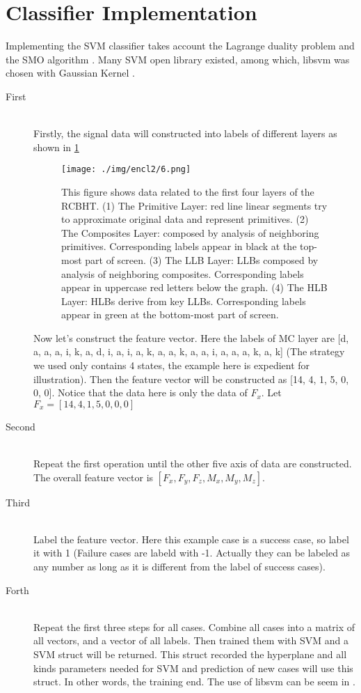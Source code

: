 \section{Classifier Implementation}
\indent Implementing the SVM classifier takes account the Lagrange duality problem \cite{hager1976lagrange} and the SMO algorithm \cite{keerthi2001improvements}. Many SVM open library existed, among which, libsvm \cite{CC01a} was chosen with Gaussian Kernel \cite{keerthi2003asymptotic}. \\
\begin{description}
    \item[First] \hfill \\
        Firstly, the signal data will constructed into labels of different layers as shown in \ref{fig:hlbehav} \cite{2013IJMA-Rojas-TwrdsSnapSensing} \\
\begin{figure}[h]
    \centering
    \texttt{[image: ./img/encl2/6.png]}
    \caption{This figure shows data related to the first four layers of the RCBHT. (1) The Primitive Layer: red line linear segments try to approximate original data and represent primitives. (2) The Composites Layer: composed by analysis of neighboring primitives. Corresponding labels appear in black at the top-most part of screen. (3) The LLB Layer: LLBs composed by analysis of neighboring composites. Corresponding labels appear in uppercase red letters below the graph. (4) The HLB Layer: HLBs derive from key LLBs. Corresponding labels appear in green at the bottom-most part of screen.}
    \label{fig:hlbehav}
\end{figure}
        Now let's construct the feature vector. Here the labels of MC layer are [d, a, a, a, i, k, a, d, i, a, i, a, k, a, a, k, a, a, i, a, a, a, k, a, k] (The strategy we used only contains 4 states, the example here is expedient for illustration). Then the feature vector will be constructed as [14, 4, 1, 5, 0, 0, 0]. Notice that the data here is only the data of $F_{x}$. Let $F_{x} = [14, 4, 1, 5, 0, 0, 0]$
    \item[Second] \hfill \\
        Repeat the first operation until the other five axis of data are constructed. The overall feature vector is $[F_{x}, F_{y}, F_{z}, M_{x}, M_{y}, M_{z}]$.
    \item[Third] \hfill \\
        Label the feature vector. Here this example case is a success case, so label it with 1 (Failure cases are labeld with -1. Actually they can be labeled as any number as long as it is different from the label of success cases). 
    \item[Forth] \hfill \\
        Repeat the first three steps for all cases. Combine all cases into a matrix of all vectors, and a vector of all labels. Then trained them with SVM and a SVM struct will be returned. This struct recorded the hyperplane and all kinds parameters needed for SVM and prediction of new cases will use this struct. In other words, the training end. The use of libsvm can be seem in \cite{CC01a}.
\end{description}













